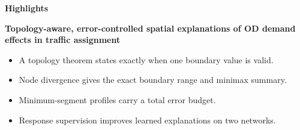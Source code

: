 \documentclass[12pt]{article}
\begin{document}
\begin{center}
{\Large\bfseries Highlights}
\end{center}

\vspace{0.5em}

\noindent\textbf{Topology-aware, error-controlled spatial explanations
of OD demand effects in traffic assignment}

\vspace{1em}

\begin{itemize}
\item A topology theorem states exactly when one boundary value is
valid.
\item Node divergence gives the exact boundary range and minimax
summary.
\item Minimum-segment profiles carry a total error budget.
\item Response supervision improves learned explanations on two
networks.
\end{itemize}
\end{document}
